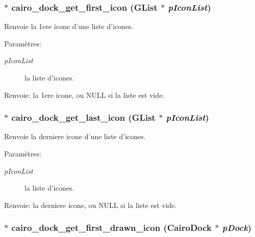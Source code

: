 \subsubsection{$\ast$ cairo\_\-dock\_\-get\_\-first\_\-icon (GList $\ast$ {\em p\-Icon\-List})}\label{cairo-dock-icons_8c_a33afd0fe00295cedadd9f7ef73d8b1e}


Renvoie la 1ere icone d'une liste d'icones. \begin{Desc}
\item[Param\`{e}tres:]
\begin{description}
\item[{\em p\-Icon\-List}]la liste d'icones. \end{description}
\end{Desc}
\begin{Desc}
\item[Renvoie:]la 1ere icone, ou NULL si la liste est vide. \end{Desc}
\subsubsection{$\ast$ cairo\_\-dock\_\-get\_\-last\_\-icon (GList $\ast$ {\em p\-Icon\-List})}\label{cairo-dock-icons_8c_dbfc665a5e83340a487626894db56333}


Renvoie la derniere icone d'une liste d'icones. \begin{Desc}
\item[Param\`{e}tres:]
\begin{description}
\item[{\em p\-Icon\-List}]la liste d'icones. \end{description}
\end{Desc}
\begin{Desc}
\item[Renvoie:]la derniere icone, ou NULL si la liste est vide. \end{Desc}
\subsubsection{$\ast$ cairo\_\-dock\_\-get\_\-first\_\-drawn\_\-icon ({\bf Cairo\-Dock} $\ast$ {\em p\-Dock})}\label{cairo-dock-icons_8c_6c95bef22b883b260f1ff3537c7fdc44}


